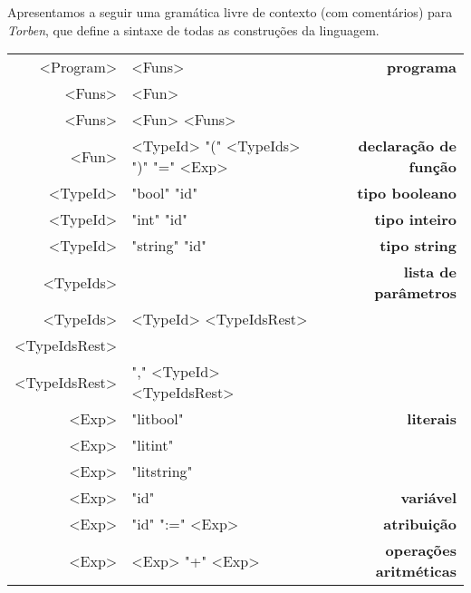 \documentclass[a4paper,10pt,brazil]{article}
\newcommand{\lang}{\textsl{Torben}}
\begin{document}
Apresentamos a seguir uma gramática livre de contexto (com comentários)
para \lang{}, que define a sintaxe de todas as construções da linguagem.

\begin{synshorts}
  \begin{center}
    \small
    \begin{tabular}{r@{$\;\rightarrow\;$}l>{\bfseries}r}
      <Program>     & <Funs>                               & programa                \\[.9em]
      <Funs>        & <Fun>                                &                         \\
      <Funs>        & <Fun> <Funs>                         &                         \\[.9em]
      <Fun>         & <TypeId> "(" <TypeIds> ")" "=" <Exp> & declaração de função    \\
      <TypeId>      & "bool" "id"                          & tipo booleano           \\
      <TypeId>      & "int" "id"                           & tipo inteiro            \\
      <TypeId>      & "string" "id"                        & tipo string             \\
      <TypeIds>     &                                      & lista de parâmetros     \\
      <TypeIds>     & <TypeId> <TypeIdsRest>               &                         \\
      <TypeIdsRest> &                                      &                         \\
      <TypeIdsRest> & "," <TypeId> <TypeIdsRest>           &                         \\[.9em]
      <Exp>         & "litbool"                            & literais                \\
      <Exp>         & "litint"                             &                         \\
      <Exp>         & "litstring"                          &                         \\
      <Exp>         & "id"                                 & variável                \\
      <Exp>         & "id" ":=" <Exp>                      & atribuição              \\
      <Exp>         & <Exp> "+" <Exp>                      & operações aritméticas   \\

\end{tabular}
\end{center}
\end{synshorts}
\end{document}
